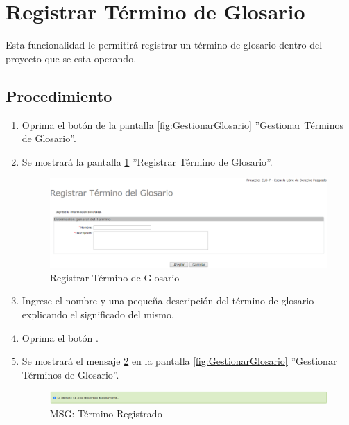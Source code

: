 
\hypertarget{cv:registrarTermino}{\section{Registrar Término de Glosario}} \label{sec:registrarTermino}

	Esta funcionalidad le permitirá registrar un término de glosario dentro del proyecto que se esta operando. 

		\subsection{Procedimiento}

			\begin{enumerate}
	
			\item Oprima el botón \IURegistrar{} de la pantalla \ref{fig:GestionarGlosario} ''Gestionar Términos de Glosario''.
			
			\item Se mostrará la pantalla \ref{fig:registrarTermino} ''Registrar Término de Glosario''.

			\begin{figure}[htbp!]
				\begin{center}
					\includegraphics[scale=0.45]{roles/lider/glosario/pantallas/IU6-1registrarTermino}
					\caption{Registrar Término de Glosario}
					\label{fig:registrarTermino}
				\end{center}
			\end{figure}
		
			\item Ingrese el nombre y una pequeña descripción del término de glosario explicando el significado del mismo.
			
			\item Oprima el botón \IUAceptar.
			
			\item Se mostrará el mensaje \ref{fig:terminoRegistrado} en la pantalla \ref{fig:GestionarGlosario} ''Gestionar Términos de Glosario''.
			
			\begin{figure}[htbp!]
				\begin{center}
					\includegraphics[scale=0.5]{roles/lider/glosario/pantallas/IU6-1MSG1}
					\caption{MSG: Término Registrado}
					\label{fig:terminoRegistrado}
				\end{center}
			\end{figure}
			\end{enumerate}